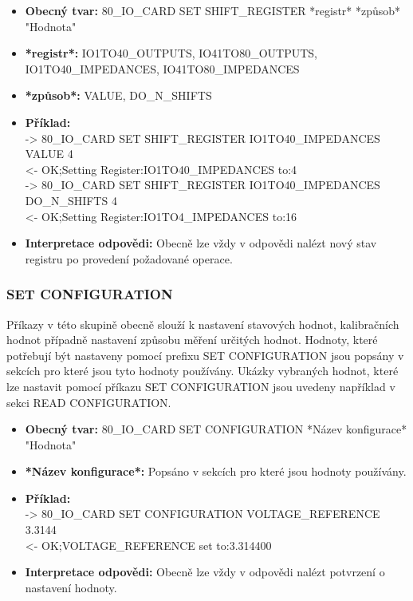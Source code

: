 \begin{itemize}[leftmargin=*]
    \item \textbf{Obecný tvar:} 80\_IO\_CARD SET SHIFT\_REGISTER *registr* *způsob* "Hodnota"
    \item \textbf{*registr*:} IO1TO40\_OUTPUTS, IO41TO80\_OUTPUTS,\\
    IO1TO40\_IMPEDANCES, IO41TO80\_IMPEDANCES
    \item \textbf{*způsob*:} VALUE, DO\_N\_SHIFTS
    \item \textbf{Příklad:}\\
    -> 80\_IO\_CARD SET SHIFT\_REGISTER IO1TO40\_IMPEDANCES VALUE 4\\
    <- OK;Setting Register:IO1TO40\_IMPEDANCES to:4\\
    -> 80\_IO\_CARD SET SHIFT\_REGISTER IO1TO40\_IMPEDANCES DO\_N\_SHIFTS 4\\
    <- OK;Setting Register:IO1TO4\_IMPEDANCES to:16
    \item \textbf{Interpretace odpovědi:} Obecně lze vždy v odpovědi nalézt nový stav registru po provedení požadované operace.
\end{itemize}

\subsubsection{SET CONFIGURATION}
Příkazy v této skupině obecně slouží k nastavení stavových hodnot, kalibračních hodnot případně nastavení způsobu
měření určitých hodnot. Hodnoty, které potřebují být nastaveny pomocí prefixu SET CONFIGURATION jsou popsány v sekcích pro které jsou tyto hodnoty používány.
Ukázky vybraných hodnot, které lze nastavit pomocí příkazu SET CONFIGURATION jsou uvedeny například v sekci READ CONFIGURATION.

\begin{itemize}[leftmargin=*]
    \item \textbf{Obecný tvar:} 80\_IO\_CARD SET CONFIGURATION *Název konfigurace* "Hodnota"
    \item \textbf{*Název konfigurace*:} Popsáno v sekcích pro které jsou hodnoty používány.
    \item \textbf{Příklad:}\\
    -> 80\_IO\_CARD SET CONFIGURATION VOLTAGE\_REFERENCE 3.3144\\
    <- OK;VOLTAGE\_REFERENCE set to:3.314400
    \item \textbf{Interpretace odpovědi:} Obecně lze vždy v odpovědi nalézt potvrzení o nastavení hodnoty.
\end{itemize}

